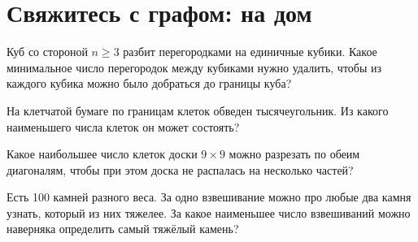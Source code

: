 
\section*{Свяжитесь с графом: на дом}



\begin{problems}

Куб со стороной $n \geq 3$ разбит перегородками на единичные кубики.
Какое минимальное число перегородок между кубиками нужно удалить, чтобы
из каждого кубика можно было добраться до границы куба?

На клетчатой бумаге по границам клеток обведен тысячеугольник.
Из какого наименьшего числа клеток он может состоять?

Какое наибольшее число клеток доски $9 \times 9$ можно разрезать по обеим
диагоналям, чтобы при этом доска не распалась на несколько частей?

Есть 100 камней разного веса.
За одно взвешивание можно про любые два камня узнать, который из них тяжелее.
За какое наименьшее число взвешиваний можно наверняка определить самый тяжёлый
камень?

\end{problems}


